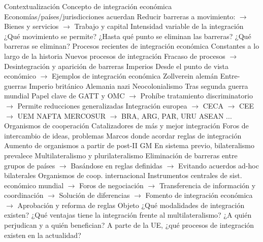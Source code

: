 \documentclass{nuevotema}
\begin{document}
\esquemalargo













\begin{esquemal}
	\1[] 
		\2 Contextualización
			\3 Concepto de integración económica
				\4 Economías/países/jurisdicciones acuerdan
				\4[] Reducir barreras a movimiento:
				\4[] $\to$ Bienes y servicios
				\4[] $\to$ Trabajo y capital
				\4 Intensidad variable de la integración
				\4[] ¿Qué movimiento se permite?
				\4[] ¿Hasta qué punto se eliminan las barreras?
				\4[] ¿Qué barreras se eliminan?
			\3 Procesos recientes de integración económica
				\4 Constantes a lo largo de la historia
				\4[] Nuevos procesos de integración
				\4[] Fracaso de procesos
				\4[] $\to$ Desintegración y aparición de barreras
				\4 Imperios
				\4[] Desde el punto de vista económico
				\4[] $\to$ Ejemplos de integración económica
				\4[] Zollverein alemán
				\4 Entre-guerras
				\4[] Imperio británico
				\4[] Alemania nazi
				\4[] Neocolonialismo
				\4 Tras segunda guerra mundial
				\4[] Papel clave de GATT y OMC
				\4[] $\to$ Prohíbe tratamiento discriminatorio
				\4[] $\to$ Permite reducciones generalizadas
				\4[] Integración europea
				\4[] $\to$ CECA $\to$ CEE $\to$ UEM
				\4[] NAFTA
				\4[] MERCOSUR
				\4[] $\to$ BRA, ARG, PAR, URU
				\4[] ASEAN
				\4[] ...
			\3 Organismos de cooperación
				\4 Catalizadores de más y mejor integración
				\4[] Foros de intercambio de ideas, problemas
				\4[] Marcos donde acordar reglas de integración
				\4 Aumento de organismos a partir de post-II GM
				\4[] En sistema previo, bilateralismo prevalece
				\4 Multilateralismo y plurilateralismo
				\4[] Eliminación de barreras entre grupos de países
				\4[] $\to$ Basándose en reglas definidas
				\4[] $\to$ Evitando acuerdos ad-hoc bilaterales
				\4[$\then$] Organismos de coop. internacional
				\4[] Instrumentos centrales de sist. económico mundial
				\4[] $\to$ Foros de negociación
				\4[] $\to$ Transferencia de información y coordinación
				\4[] $\to$ Solución de diferencias
				\4[] $\to$ Fomento de integración económica
				\4[] $\to$ Aprobación y reforma de reglas
		\2 Objeto
			\3 ¿Qué modalidades de integración existen?
			\3 ¿Qué ventajas tiene la integración frente al multilateralismo?
			\3 ¿A quién perjudican y a quién benefician?
			\3 A parte de la UE, ¿qué procesos de integración existen en la actualidad?

\end{esquemal}
\end{document}
